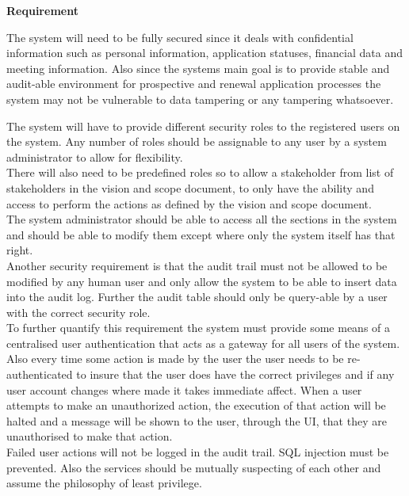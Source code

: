 \begin{flushleft}
\vspace{0.1in}

\textbf{Requirement}

The system will need to be fully secured since it deals with confidential information such as personal information, application statuses, financial data and meeting information. Also since the systems main goal is to provide stable and audit-able environment for prospective and renewal application processes the system may not be vulnerable to data tampering or any tampering whatsoever.\\
\vspace{0.1in}

The system will have to provide different security roles to the registered users on the system. Any number of roles should be assignable to any user by a system administrator to allow for flexibility.\\
There will also need to be predefined roles so to allow a stakeholder from list of stakeholders in the vision and scope document, to only have the ability and access to perform the actions as defined by the vision and scope document.\\
The system administrator should be able to access all the sections in the system and should be able to modify them except where only the system itself has that right.\\
Another security requirement is that the audit trail must not be allowed to be modified by any human user and only allow the system to be able to insert data into the audit log. Further the audit table should only be query-able by a user with the correct security role.\\
To further quantify this requirement the system must provide some means of a centralised user authentication that acts as a gateway for all users of the system. Also every time some action is made by the user the user needs to be re-authenticated to insure that the user does have the correct privileges and if any user account changes where made it takes immediate affect. When a user attempts to make an unauthorized action, the execution of that action will be halted and a message will be shown to the user, through the UI, that they are unauthorised to make that action.\\
Failed user actions will not be logged in the audit trail. SQL injection must be prevented. Also the services should be mutually suspecting of each other and assume the philosophy of least privilege.
\vspace{0.1in}


\end{flushleft}
